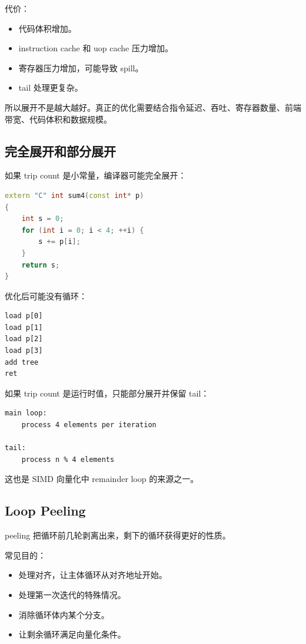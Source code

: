 代价：

\begin{itemize}
  \item 代码体积增加。
  \item instruction cache 和 uop cache 压力增加。
  \item 寄存器压力增加，可能导致 spill。
  \item tail 处理更复杂。
\end{itemize}

所以展开不是越大越好。真正的优化需要结合指令延迟、吞吐、寄存器数量、前端带宽、代码体积和数据规模。

\subsection{完全展开和部分展开}

如果 trip count 是小常量，编译器可能完全展开：

\begin{lstlisting}[language=C++]
extern "C" int sum4(const int* p)
{
    int s = 0;
    for (int i = 0; i < 4; ++i) {
        s += p[i];
    }
    return s;
}
\end{lstlisting}

优化后可能没有循环：

\begin{lstlisting}
load p[0]
load p[1]
load p[2]
load p[3]
add tree
ret
\end{lstlisting}

如果 trip count 是运行时值，只能部分展开并保留 tail：

\begin{lstlisting}
main loop:
    process 4 elements per iteration

tail:
    process n % 4 elements
\end{lstlisting}

这也是 SIMD 向量化中 remainder loop 的来源之一。

\subsection{Loop Peeling}

peeling 把循环前几轮剥离出来，剩下的循环获得更好的性质。

常见目的：

\begin{itemize}
  \item 处理对齐，让主体循环从对齐地址开始。
  \item 处理第一次迭代的特殊情况。
  \item 消除循环体内某个分支。
  \item 让剩余循环满足向量化条件。
\end{itemize}

